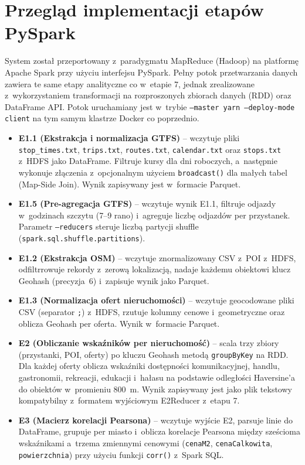 \documentclass{labreport}
\author{
    Szymon Jędrzejczak (266867) \\
    Mateusz Nasewicz (268513) \\
    Szymon Wieczorek (266586) \\
}
\date{31.05.2026}
\begin{document}
\maketitle
\tableofcontents
\newpage

\section{Przegląd implementacji etapów PySpark}

System został przeportowany z~paradygmatu MapReduce (Hadoop) na platformę Apache Spark przy użyciu interfejsu PySpark. Pełny potok przetwarzania danych zawiera te same etapy analityczne co w~etapie 7, jednak zrealizowane z~wykorzystaniem transformacji na rozproszonych zbiorach danych (RDD) oraz DataFrame API. Potok uruchamiany jest w~trybie \texttt{--master yarn --deploy-mode client} na tym samym klastrze Docker co poprzednio.

\begin{itemize}
    \item \textbf{E1.1 (Ekstrakcja i normalizacja GTFS)} -- wczytuje pliki \texttt{stop\_times.txt}, \texttt{trips.txt}, \texttt{routes.txt}, \texttt{calendar.txt} oraz \texttt{stops.txt} z~HDFS jako DataFrame. Filtruje kursy dla dni roboczych, a~następnie wykonuje złączenia z~opcjonalnym użyciem \texttt{broadcast()} dla małych tabel (Map-Side Join). Wynik zapisywany jest w~formacie Parquet.
    \item \textbf{E1.5 (Pre-agregacja GTFS)} -- wczytuje wynik E1.1, filtruje odjazdy w~godzinach szczytu (7--9 rano) i~agreguje liczbę odjazdów per przystanek. Parametr \texttt{--reducers} steruje liczbą partycji shuffle (\texttt{spark.sql.shuffle.partitions}).
    \item \textbf{E1.2 (Ekstrakcja OSM)} -- wczytuje znormalizowany CSV z~POI z~HDFS, odfiltrrowuje rekordy z~zerową lokalizacją, nadaje każdemu obiektowi klucz Geohash (precyzja~6) i~zapisuje wynik jako Parquet.
    \item \textbf{E1.3 (Normalizacja ofert nieruchomości)} -- wczytuje geocodowane pliki CSV (separator \texttt{;}) z~HDFS, rzutuje kolumny cenowe i~geometryczne oraz oblicza Geohash per oferta. Wynik w~formacie Parquet.
    \item \textbf{E2 (Obliczanie wskaźników per nieruchomość)} -- scala trzy zbiory (przystanki, POI, oferty) po kluczu Geohash metodą \texttt{groupByKey} na RDD. Dla każdej oferty oblicza wskaźniki dostępności komunikacyjnej, handlu, gastronomii, rekreacji, edukacji i~hałasu na podstawie odległości Haversine'a do obiektów w~promieniu 800~m. Wynik zapisywany jest jako plik tekstowy kompatybilny z~formatem wyjściowym E2Reducer z~etapu 7.
    \item \textbf{E3 (Macierz korelacji Pearsona)} -- wczytuje wyjście E2, parsuje linie do DataFrame, grupuje per miasto i~oblicza korelacje Pearsona między sześcioma wskaźnikami a~trzema zmiennymi cenowymi (\texttt{cenaM2}, \texttt{cenaCalkowita}, \texttt{powierzchnia}) przy użyciu funkcji \texttt{corr()} z~Spark SQL.
\end{itemize}
\end{document}
